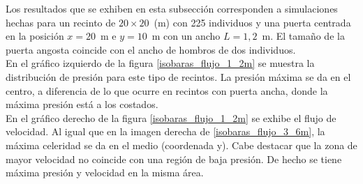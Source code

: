 Los resultados que se exhiben en esta subsección corresponden a simulaciones hechas para un recinto de  $20\times 20$~(m) con 225 individuos y una puerta centrada en la posición $x=20$~m e $y=10$~m con un ancho $L=1,2$~m. El tamaño de la puerta angosta coincide con el ancho de hombros de dos individuos.\\
En el gráfico izquierdo de la figura \ref{isobaras_flujo_1_2m} se muestra la distribución de presión para este tipo de recintos. La presión máxima se da en el centro, a diferencia de lo que ocurre en recintos con puerta ancha, donde la máxima presión está a los costados.\\
En el gráfico derecho de la figura \ref{isobaras_flujo_1_2m} se exhibe el flujo de velocidad. Al igual que en la imagen derecha de  \ref{isobaras_flujo_3_6m}, la máxima celeridad se da en el medio (coordenada y).
Cabe destacar que la zona de mayor velocidad no coincide con una región de baja presión. De hecho se tiene máxima presión y velocidad en la misma área.  

